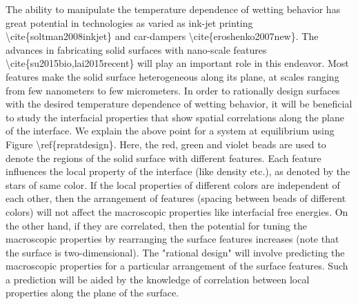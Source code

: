 \par The ability to manipulate the temperature dependence of wetting behavior has great potential in technologies as varied as ink-jet printing \textbackslash cite\{soltman2008inkjet\} and car-dampers \textbackslash cite\{eroshenko2007new\}. The advances in fabricating solid surfaces with nano-scale features \textbackslash cite\{su2015bio,lai2015recent\} will play an important role in this endeavor. Most features make the solid surface heterogeneous along its plane, at scales ranging from few nanometers to few micrometers. In order to rationally design surfaces with  the desired temperature dependence of wetting behavior, it will be beneficial to study the interfacial properties that show spatial correlations along the plane of the interface. We explain the above point for a system at equilibrium using Figure \textbackslash ref\{repratdesign\}. Here, the red, green and violet beads are used to denote the regions of the solid surface with different features. Each feature influences the local property of the interface (like density etc.), as denoted by the stars of same color. If the local properties of different colors are independent of each other, then the arrangement of features (spacing between beads of different colors) will not affect the macroscopic properties like interfacial free energies. On the other hand,  if they are correlated, then the potential for tuning the macroscopic properties by rearranging the surface features increases (note that the surface is two-dimensional). The "rational design" will involve predicting the macroscopic properties for a particular arrangement of the surface features. Such a prediction will be aided by the knowledge of correlation between local properties along the plane of the surface.
